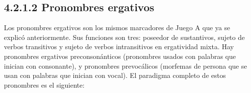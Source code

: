 \documentclass{article}%
\begin{document}
\subsection{4.2.1.2 Pronombres ergativos}%
\label{subsec:4.2.1.2Pronombresergativos}%

%
Los pronombres ergativos son los mismos marcadores de Juego A que ya se %
explicó anteriormente. Sus funciones son tres: poseedor de sustantivos, sujeto de %
verbos transitivos y sujeto de verbos intransitivos en ergatividad mixta. Hay %
pronombres ergativos preconsonánticos (pronombres usados con palabras que inician %
con consonante), y pronombres prevocálicos (morfemas de persona que se usan con %
palabras que inician con vocal). El paradigma completo de estos pronombres es el %
siguiente: 

%
\end{document}
